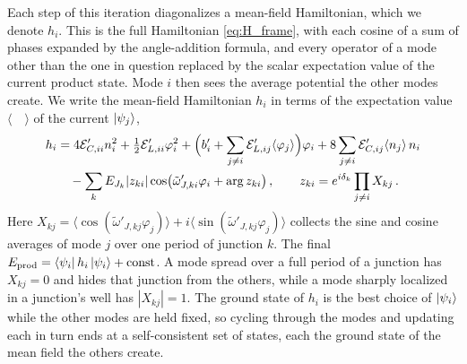 Each step of this iteration diagonalizes a mean-field Hamiltonian, which we denote $h_i$.
This is the full Hamiltonian \cref{eq:H_frame}, with each cosine of a sum of phases expanded by the angle-addition formula, and every operator of a mode other than the one in question replaced by the scalar expectation value of the current product state.
Mode $i$ then sees the average potential the other modes create.
We write the mean-field Hamiltonian $h_i$ in terms of the expectation value  $\langle\quad\rangle$ of the current $\ket{\psi_j}$,
\begin{align}
    h_i&=4\mathcal E'_{C,ii}n_i^2+\tfrac12\mathcal E'_{L,ii}\varphi_i^2
    +\Bigl(b_i'+\sum_{j\neq i}\mathcal E'_{L,ij}\langle\varphi_j\rangle\Bigr)\varphi_i
    +8\sum_{j\neq i}\mathcal E'_{C,ij}\langle n_j\rangle\,n_i \nonumber\\
    &\quad-\sum_kE_{J_k}|z_{ki}|\cos\bigl(\tilde\omega_{J,ki}'\varphi_i+\arg z_{ki}\bigr)\, ,\qquad
    z_{ki}=e^{i\delta_k}\prod_{j\neq i}X_{kj}\, .
    \label{eq:mean_field_h}
\end{align}
Here $X_{kj}=\langle\cos(\tilde\omega'_{J,kj}\varphi_j)\rangle+i\langle\sin(\tilde\omega'_{J,kj}\varphi_j)\rangle$ collects the sine and cosine averages of mode $j$ over one period of junction $k$.
The final $E_{\rm prod}=\bra{\psi_i}h_i\ket{\psi_i}+{\rm const}$.
A mode spread over a full period of a junction has $X_{kj}=0$ and hides that junction from the others, while a mode sharply localized in a junction's well has $|X_{kj}|=1$.
The ground state of $h_i$ is the best choice of $\ket{\psi_i}$ while the other modes are held fixed, so cycling through the modes and updating each in turn ends at a self-consistent set of states, each the ground state of the mean field the others create.

